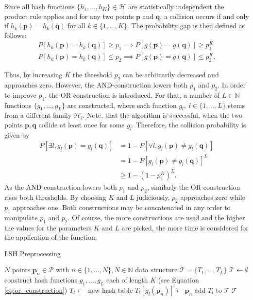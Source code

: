 \documentclass[../../../main.tex]{subfiles}
\begin{document}
Since all hash functions $\{h_1, \dots, h_K\} \in \mathcal{H}$ are statistically independent the product rule applies and for any two points $\bm{p}$ and $\bm{q}$, a collision occurs if and only if $h_k(\bm{p})=h_k(\bm{q})$ for all $k \in \{1, \dots, K\}$. The probability gap is then defined as follows:
\begin{align*}
    P[h_k(\bm{p})=h_k(\bm{q})] \geq p_1 \implies P[g(\bm{p})=g(\bm{q})] \geq p_1^K \\
    P[h_k(\bm{p})=h_k(\bm{q})] \leq p_2 \implies P[g(\bm{p})=g(\bm{q})] \leq p_2^K.
\end{align*}

Thus, by increasing $K$ the threshold $p_2$ can be arbitrarily decreased and approaches zero. However, the AND-construction lowers both $p_1$ and $p_2$. In order to improve $p_1$, the OR-construction is introduced. For that, a number of $L \in \mathbb{N}$ functions $\{g_1, \dots, g_L\}$ are constructed, where each function $g_l, \; l \in \{1, \dots, L\}$ stems from a different family $\mathcal{H}_l$. Note, that the algorithm is successful, when the two points $\bm{p}, \bm{q}$ collide at least once for some $g_l$. Therefore, the collision probability is given by
\begin{align*}
    P[\exists l, g_l(\bm{p})=g_l(\bm{q})] &= 1 - P[\forall l, g_l(\bm{p}) \neq g_l(\bm{q})] \\
                                &= 1 - P[g_l(\bm{p}) \neq g_l(\bm{q})]^L \\
                                &\geq 1 - (1-p_1^K)^L.
\end{align*}
As the AND-construction lowers both $p_1$ and $p_2$, similarly the OR-construction rises both thresholds. By choosing $K$ and $L$ judiciously, $p_2$ approaches zero while $p_1$ approaches one. Both constructions may be concatenated in any order to manipulate $p_1$ and $p_2$. Of course, the more constructions are used and the higher the values for the parameters $K$ and $L$ are picked, the more time is considered for the application of the function. 

\begin{algorithm}
    \caption{LSH Preprocessing}
    \label{alg:lsh_preprocess}
    \begin{algorithmic}[1]
        \REQUIRE $N$ points $\bm{p}_n \in \mathcal{P}$ with $n \in \{1, \dots, N\}, N \in \mathbb{N}$
        \ENSURE data structure $\mathcal{T} = \{T_1, \dots, T_L\}$
        \STATE $\mathcal{T} \leftarrow \emptyset$
        \STATE construct hash functions $g_1, \dots, g_L$ each of length $K$ (see Equation \ref{eq:or_construction})
            \STATE $T_l \leftarrow$ new hash table
                \STATE $T_l[g_l(\bm{p}_n)] \leftarrow \bm{p}_n$
            \ENDFOR
            \STATE add $T_l$ to $\mathcal{T}$
        \ENDFOR
        \RETURN $\mathcal{T}$
    \end{algorithmic}
 \end{algorithm}
\end{document}
